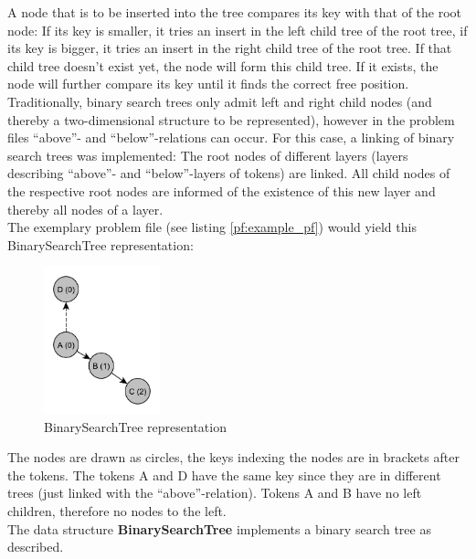 \documentclass[hidelinks]{scrartcl}
\begin{document}
A node that is to be inserted into the tree compares its key with that of the root node: If its key is smaller, it tries an insert in the left child tree of the root tree, if its key is bigger, it tries an insert in the right child tree of the root tree. If that child tree doesn't exist yet, the node will form this child tree. If it exists, the node will further compare its key until it finds the correct free position. \\

Traditionally, binary search trees only admit left and right child nodes (and thereby a two-dimensional structure to be represented), however in the problem files ``above''- and ``below''-relations can occur. For this case, a linking of binary search trees was implemented: The root nodes of different layers (layers describing ``above''- and ``below''-layers of \gls{token}s) are linked. All child nodes of the respective root nodes are informed of the existence of this new layer and thereby all nodes of a layer. \\

\noindent The exemplary problem file (see listing \ref{pf:example_pf}) would yield this BinarySearchTree representation:

\begin{figure}[H]
	\caption{BinarySearchTree representation}
	\label{img:binarysearchtree_example_pf}
	\centering
	\includegraphics[width=0.3\textwidth]{Illustrations/BinarySearchTree.pdf}
\end{figure}

The nodes are drawn as circles, the keys indexing the nodes are in brackets after the \gls{token}s. The \gls{token}s A and D have the same key since they are in different trees (just linked with the ``above''-relation). Tokens A and B have no left children, therefore no nodes to the left. \\
The data structure \textbf{BinarySearchTree} implements a binary search tree as described. \\
\end{document}
